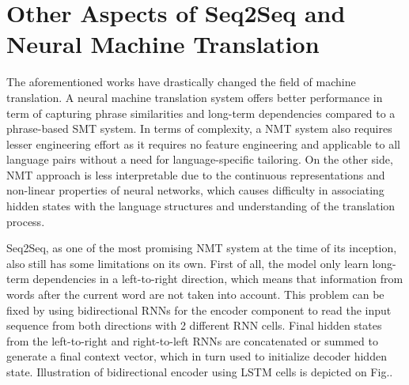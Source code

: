 \documentclass[12pt]{extarticle}
\begin{document}
\section*{Other Aspects of Seq2Seq and Neural Machine Translation} %
The aforementioned works \citep{kalchbrenner-blunsom-2013-recurrent-continuous,cho-etal-2014-learning, Sutskever:2014:SSL:2969033.2969173} have drastically changed the field of machine translation. A neural machine translation system offers better performance in term of capturing phrase similarities and long-term dependencies compared to a phrase-based SMT system. In terms of complexity, a NMT system also requires lesser engineering effort as it requires no feature engineering and applicable to all language pairs without a need for language-specific tailoring. On the other side, NMT approach is less interpretable due to the continuous representations and non-linear properties of neural networks, which causes difficulty in associating hidden states with the language structures and understanding of the translation process.

Seq2Seq, as one of the most promising NMT system at the time of its inception, also still has some limitations on its own. First of all, the model only learn long-term dependencies in a left-to-right direction, which means that information from words after the current word are not taken into account. This problem can be fixed by using bidirectional RNNs \citep{Schuster:1997:BRN:2198065.2205129} for the encoder component to read the input sequence from both directions with 2 different RNN cells. Final hidden states from the left-to-right and right-to-left RNNs are concatenated or summed to generate a final context vector, which in turn used to initialize decoder hidden state. Illustration of bidirectional encoder using LSTM cells is depicted on Fig..
\end{document}

